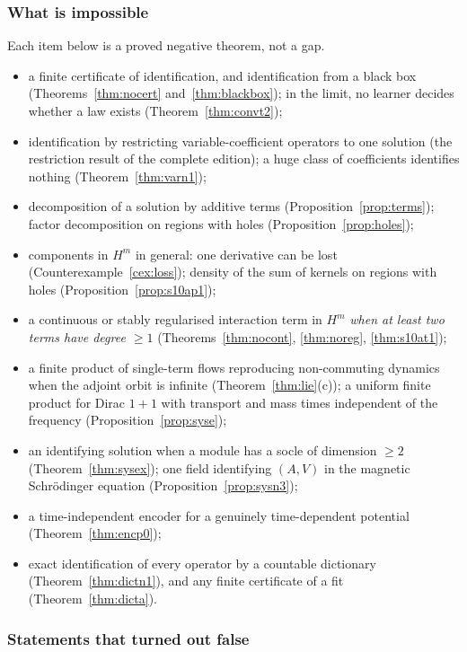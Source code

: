 \documentclass[11pt]{article}
\theoremstyle{plain}
\theoremstyle{definition}
\theoremstyle{remark}
\begin{document}
\subsubsection{What is impossible}

Each item below is a proved negative theorem, not a gap.
\begin{itemize}
\item a finite certificate of identification, and identification from a black box (Theorems~\ref{thm:nocert} and~\ref{thm:blackbox}); in the limit, no learner decides whether a law exists (Theorem~\ref{thm:convt2});
\item identification by restricting variable-coefficient operators to one solution (the restriction result of the complete edition); a huge class of coefficients identifies nothing (Theorem~\ref{thm:varn1});
\item decomposition of a solution by additive terms (Proposition~\ref{prop:terms}); factor decomposition on regions with holes (Proposition~\ref{prop:holes});
\item components in $H^m$ in general: one derivative can be lost (Counterexample~\ref{cex:loss}); density of the sum of kernels on regions with holes (Proposition~\ref{prop:s10ap1});
\item a continuous or stably regularised interaction term in $H^m$ \emph{when at least two terms have degree $\ge1$} (Theorems~\ref{thm:nocont}, \ref{thm:noreg}, \ref{thm:s10at1});
\item a finite product of single-term flows reproducing non-commuting dynamics when the adjoint orbit is infinite (Theorem~\ref{thm:lie}(c)); a uniform finite product for Dirac $1+1$ with transport and mass times independent of the frequency (Proposition~\ref{prop:syse});
\item an identifying solution when a module has a socle of dimension $\ge2$ (Theorem~\ref{thm:sysex}); one field identifying $(A,V)$ in the magnetic Schr\"odinger equation (Proposition~\ref{prop:sysn3});
\item a time-independent encoder for a genuinely time-dependent potential (Theorem~\ref{thm:encp0});
\item exact identification of every operator by a countable dictionary (Theorem~\ref{thm:dictn1}), and any finite certificate of a fit (Theorem~\ref{thm:dicta}).
\end{itemize}

\subsubsection{Statements that turned out false}
\end{document}
